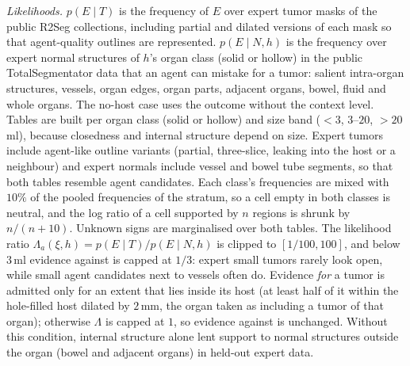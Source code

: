 \documentclass[fleqn,10pt]{olplainarticle}
\begin{document}
\emph{Likelihoods.} $p(E\mid T)$ is the frequency of $E$ over expert tumor masks of the public R2Seg collections, including
partial and dilated versions of each mask so that agent-quality outlines are represented. $p(E\mid N,h)$ is the frequency over
expert normal structures of $h$'s organ class (solid or hollow) in the public TotalSegmentator data that an agent can mistake for a tumor:
salient intra-organ structures, vessels, organ edges, organ parts, adjacent organs, bowel, fluid and whole organs. The no-host
case uses the outcome without the context level. Tables are built per organ class (solid or hollow) and size band ($<3$, $3$--$20$, $>20$\,ml), because closedness and
internal structure depend on size. Expert tumors include agent-like outline variants (partial, three-slice, leaking into the host
or a neighbour) and expert normals include vessel and bowel tube segments, so that both tables resemble agent candidates. Each
class's frequencies are mixed with $10\%$ of the pooled frequencies of the stratum, so a cell empty in both classes is neutral, and
the log ratio of a cell supported by $n$ regions is shrunk by $n/(n+10)$. Unknown signs are marginalised over both tables. The
likelihood ratio $\Lambda_a(\xi,h)=p(E\mid T)/p(E\mid N,h)$ is clipped to $[1/100,100]$, and below $3$\,ml evidence against is
capped at $1/3$: expert small tumors rarely look open, while small agent candidates next to vessels often do. Evidence \emph{for} a tumor is admitted only
for an extent that lies inside its host (at least half of it within the hole-filled host dilated by $2$\,mm, the organ taken as
including a tumor of that organ); otherwise $\Lambda$ is capped at $1$, so evidence against is unchanged. Without this condition,
internal structure alone lent support to normal structures outside the organ (bowel and adjacent organs) in held-out expert
data.
\end{document}
